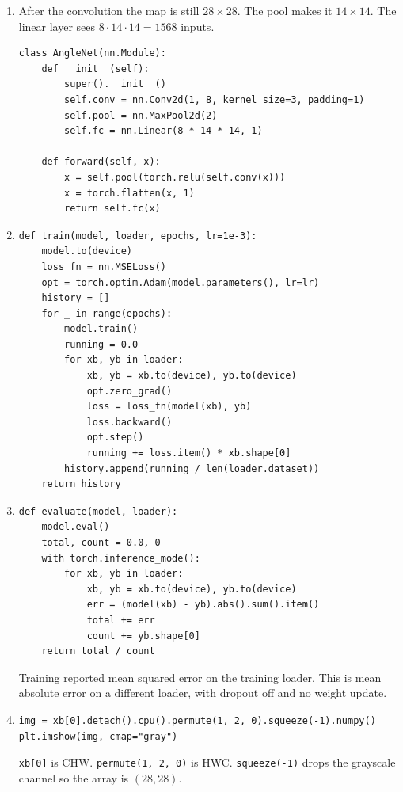 \documentclass[11pt]{article}
\begin{document}
\begin{enumerate}
\item After the convolution the map is still $28\times 28$. The pool makes it $14\times 14$. The linear layer sees $8\cdot 14\cdot 14=1568$ inputs.
\begin{verbatim}
class AngleNet(nn.Module):
    def __init__(self):
        super().__init__()
        self.conv = nn.Conv2d(1, 8, kernel_size=3, padding=1)
        self.pool = nn.MaxPool2d(2)
        self.fc = nn.Linear(8 * 14 * 14, 1)

    def forward(self, x):
        x = self.pool(torch.relu(self.conv(x)))
        x = torch.flatten(x, 1)
        return self.fc(x)
\end{verbatim}

\item
\begin{verbatim}
def train(model, loader, epochs, lr=1e-3):
    model.to(device)
    loss_fn = nn.MSELoss()
    opt = torch.optim.Adam(model.parameters(), lr=lr)
    history = []
    for _ in range(epochs):
        model.train()
        running = 0.0
        for xb, yb in loader:
            xb, yb = xb.to(device), yb.to(device)
            opt.zero_grad()
            loss = loss_fn(model(xb), yb)
            loss.backward()
            opt.step()
            running += loss.item() * xb.shape[0]
        history.append(running / len(loader.dataset))
    return history
\end{verbatim}

\item
\begin{verbatim}
def evaluate(model, loader):
    model.eval()
    total, count = 0.0, 0
    with torch.inference_mode():
        for xb, yb in loader:
            xb, yb = xb.to(device), yb.to(device)
            err = (model(xb) - yb).abs().sum().item()
            total += err
            count += yb.shape[0]
    return total / count
\end{verbatim}
Training reported mean squared error on the training loader. This is mean absolute error on a different loader, with dropout off and no weight update.

\item
\begin{verbatim}
img = xb[0].detach().cpu().permute(1, 2, 0).squeeze(-1).numpy()
plt.imshow(img, cmap="gray")
\end{verbatim}
\texttt{xb[0]} is CHW. \texttt{permute(1, 2, 0)} is HWC. \texttt{squeeze(-1)} drops the grayscale channel so the array is $(28,28)$.
\end{enumerate}
\end{document}
